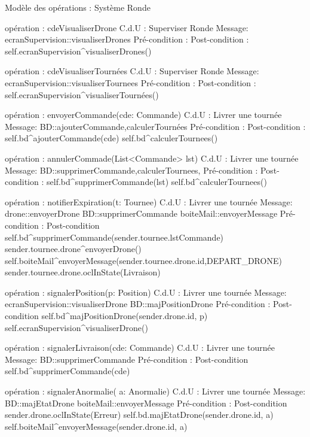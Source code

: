 Modèle des opérations : Système Ronde


opération : cdeVisualiserDrone
C.d.U : Superviser Ronde
Message: 
        ecranSupervision::{visualiserDrones}
Pré-condition : 
Post-condition :
self.ecranSupervision^visualiserDrones()




 opération : cdeVisualiserTournées
C.d.U : Superviser Ronde
Message:
ecranSupervision::{visualiserTournees} 
Pré-condition : 
Post-condition :
self.ecranSupervision^visualiserTournées()




 opération : envoyerCommande(cde: Commande)
C.d.U : Livrer une tournée
Message:
BD::{ajouterCommande,calculerTournées} 
Pré-condition : 
Post-condition :
        self.bd^ajouterCommande(cde)
self.bd^calculerTournees()




opération : annulerCommade(List<Commande> lst)
C.d.U : Livrer une tournée
Message:
BD::{supprimerCommande,calculerTournees,} 
Pré-condition : 
Post-condition :
self.bd^supprimerCommande(lst)
self.bd^calculerTournees()










opération : notifierExpiration(t: Tournee)
C.d.U : Livrer une tournée
Message:
drone::{envoyerDrone}
BD::{supprimerCommande}
boiteMail::{envoyerMessage} 
Pré-condition : 
Post-condition 
self.bd^supprimerCommande(sender.tournee.lstCommande)
sender.tournee.drone^envoyerDrone()
self.boiteMail^envoyerMessage(sender.tournee.drone.id,DEPART_DRONE)
sender.tournee.drone.oclInState(Livraison)






opération : signalerPosition(p: Position)
C.d.U : Livrer une tournée
Message:
ecranSupervision::{visualiserDrone}
BD::{majPositionDrone} 
Pré-condition : 
Post-condition 
self.bd^majPositionDrone(sender.drone.id, p)
self.ecranSupervision^visualiserDrone()




opération : signalerLivraison(cde: Commande)
C.d.U : Livrer une tournée
Message:
BD::{supprimerCommande} 
Pré-condition : 
Post-condition 
self.bd^supprimerCommande(cde)






opération : signalerAnormalie( a: Anormalie)
C.d.U : Livrer une tournée
Message:
BD::{majEtatDrone}
boiteMail::{envoyerMessage}  
Pré-condition : 
Post-condition 
sender.drone.oclInState(Erreur)
self.bd.majEtatDrone(sender.drone.id, a)
self.boiteMail^envoyerMessage(sender.drone.id, a)




